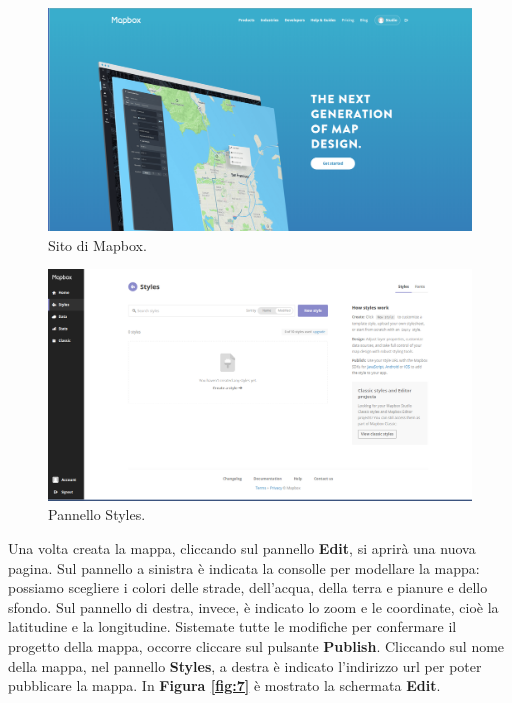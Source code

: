 \documentclass[a4paper,11pt]{article}
\begin{document}
\newpage
\begin{figure}[htpb]
	\centering
	\includegraphics[scale=0.25]{Mapbox.png}
	\caption{Sito di Mapbox.}
	\label{fig:5}
\end{figure}
\begin{figure}[htpb]
	\centering
	\includegraphics[scale=0.26]{Styles.png}
	\caption{Pannello Styles.}
	\label{fig:6}
\end{figure}
Una volta creata la mappa, cliccando sul pannello \textbf{Edit}, si aprirà una nuova pagina.
Sul pannello a sinistra è indicata la consolle per modellare la mappa: possiamo scegliere i colori delle strade, dell'acqua, della terra e pianure e dello sfondo.\newline
Sul pannello di destra, invece, è indicato lo zoom e le coordinate, cioè la latitudine e la longitudine. Sistemate tutte le modifiche per confermare il progetto della mappa, occorre cliccare sul pulsante \textbf{Publish}.
Cliccando sul nome della mappa, nel pannello \textbf{Styles}, a destra è indicato l'indirizzo url per poter pubblicare la mappa.
In \textbf{Figura \ref{fig:7}} è mostrato la schermata \textbf{Edit}.
\end{document}

